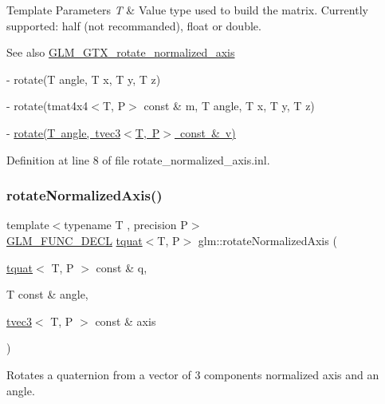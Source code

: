 \begin{DoxyTemplParams}{Template Parameters}
{\em T} & Value type used to build the matrix. Currently supported\+: half (not recommanded), float or double.\\
\hline
\end{DoxyTemplParams}
\begin{DoxySeeAlso}{See also}
\mbox{\hyperlink{group__gtx__rotate__normalized__axis}{G\+L\+M\+\_\+\+G\+T\+X\+\_\+rotate\+\_\+normalized\+\_\+axis}} 

-\/ rotate(\+T angle, T x, T y, T z) 

-\/ rotate(tmat4x4$<$\+T, P$>$ const \& m, T angle, T x, T y, T z) 

-\/ \mbox{\hyperlink{group__gtx__transform_ga2020c91bf61e050882b3a5c18eada700}{rotate(\+T angle, tvec3$<$\+T, P$>$ const \& v)}} 
\end{DoxySeeAlso}


Definition at line 8 of file rotate\+\_\+normalized\+\_\+axis.\+inl.

\mbox{\label{group__gtx__rotate__normalized__axis_ga6c00234d844faef36a6a94669fbd1639}} 
\subsubsection{\texorpdfstring{rotateNormalizedAxis()}{rotateNormalizedAxis()}\hspace{0.1cm}{\footnotesize\ttfamily [2/2]}}
{\footnotesize\ttfamily template$<$typename T , precision P$>$ \\
\mbox{\hyperlink{setup_8hpp_ab2d052de21a70539923e9bcbf6e83a51}{G\+L\+M\+\_\+\+F\+U\+N\+C\+\_\+\+D\+E\+CL}} \mbox{\hyperlink{structglm_1_1tquat}{tquat}}$<$T, P$>$ glm\+::rotate\+Normalized\+Axis (\begin{DoxyParamCaption}\item[{\mbox{\hyperlink{structglm_1_1tquat}{tquat}}$<$ T, P $>$ const \&}]{q,  }\item[{T const \&}]{angle,  }\item[{\mbox{\hyperlink{structglm_1_1tvec3}{tvec3}}$<$ T, P $>$ const \&}]{axis }\end{DoxyParamCaption})}

Rotates a quaternion from a vector of 3 components normalized axis and an angle.


